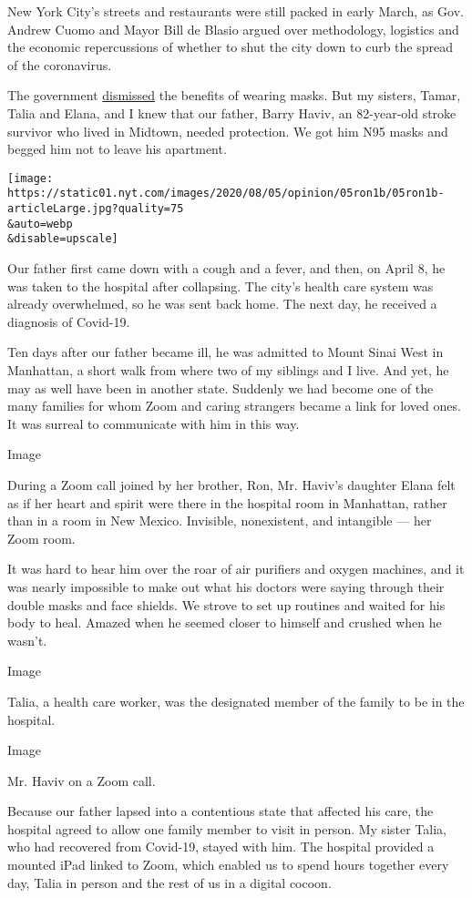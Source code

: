 New York City's streets and restaurants were still packed in early
March, as Gov. Andrew Cuomo and Mayor Bill de Blasio argued over
methodology, logistics and the economic repercussions of whether to shut
the city down to curb the spread of the coronavirus.

The government
\href{https://www.politico.com/news/2020/03/30/coronavirus-masks-trump-administration-156327}{dismissed}
the benefits of wearing masks. But my sisters, Tamar, Talia and Elana,
and I knew that our father, Barry Haviv, an 82-year-old stroke survivor
who lived in Midtown, needed protection. We got him N95 masks and begged
him not to leave his apartment.

\texttt{[image: https://static01.nyt.com/images/2020/08/05/opinion/05ron1b/05ron1b-articleLarge.jpg?quality=75\\\&auto=webp\\\&disable=upscale]}

Our father first came down with a cough and a fever, and then, on April
8, he was taken to the hospital after collapsing. The city's health care
system was already overwhelmed, so he was sent back home. The next day,
he received a diagnosis of Covid-19.

Ten days after our father became ill, he was admitted to Mount Sinai
West in Manhattan, a short walk from where two of my siblings and I
live. And yet, he may as well have been in another state. Suddenly we
had become one of the many families for whom Zoom and caring strangers
became a link for loved ones. It was surreal to communicate with him in
this way.

Image

During a Zoom call joined by her brother, Ron, Mr. Haviv's daughter
Elana felt as if her heart and spirit were there in the hospital room in
Manhattan, rather than in a room in New Mexico. Invisible, nonexistent,
and intangible --- her Zoom room.

It was hard to hear him over the roar of air purifiers and oxygen
machines, and it was nearly impossible to make out what his doctors were
saying through their double masks and face shields. We strove to set up
routines and waited for his body to heal. Amazed when he seemed closer
to himself and crushed when he wasn't.

Image

Talia, a health care worker, was the designated member of the family to
be in the hospital.

Image

Mr. Haviv on a Zoom call.

Because our father lapsed into a contentious state that affected his
care, the hospital agreed to allow one family member to visit in person.
My sister Talia, who had recovered from Covid-19, stayed with him. The
hospital provided a mounted iPad linked to Zoom, which enabled us to
spend hours together every day, Talia in person and the rest of us in a
digital cocoon.

